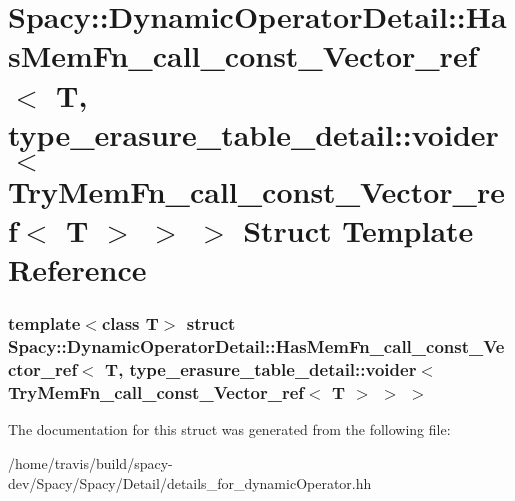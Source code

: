 \hypertarget{structSpacy_1_1DynamicOperatorDetail_1_1HasMemFn__call__const__Vector__ref_3_01T_00_01type__erase139c760ce8be3ff90ba6adbf9578604}{\section{\-Spacy\-:\-:\-Dynamic\-Operator\-Detail\-:\-:\-Has\-Mem\-Fn\-\_\-call\-\_\-const\-\_\-\-Vector\-\_\-ref$<$ \-T, type\-\_\-erasure\-\_\-table\-\_\-detail\-:\-:voider$<$ \-Try\-Mem\-Fn\-\_\-call\-\_\-const\-\_\-\-Vector\-\_\-ref$<$ \-T $>$ $>$ $>$ \-Struct \-Template \-Reference}
\label{structSpacy_1_1DynamicOperatorDetail_1_1HasMemFn__call__const__Vector__ref_3_01T_00_01type__erase139c760ce8be3ff90ba6adbf9578604}
}
\subsubsection*{template$<$class T$>$ struct Spacy\-::\-Dynamic\-Operator\-Detail\-::\-Has\-Mem\-Fn\-\_\-call\-\_\-const\-\_\-\-Vector\-\_\-ref$<$ T, type\-\_\-erasure\-\_\-table\-\_\-detail\-::voider$<$ Try\-Mem\-Fn\-\_\-call\-\_\-const\-\_\-\-Vector\-\_\-ref$<$ T $>$ $>$ $>$}



\-The documentation for this struct was generated from the following file\-:\begin{DoxyCompactItemize}
\item 
/home/travis/build/spacy-\/dev/\-Spacy/\-Spacy/\-Detail/details\-\_\-for\-\_\-dynamic\-Operator.\-hh\end{DoxyCompactItemize}
